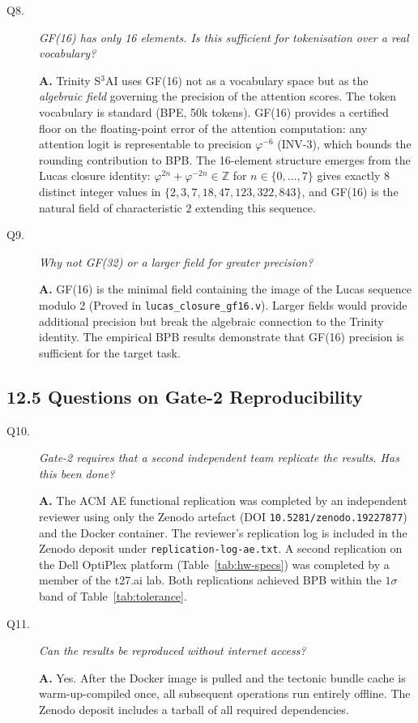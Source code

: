 \begin{description}
\item[Q8.] \emph{GF(16) has only 16 elements.  Is this sufficient for
  tokenisation over a real vocabulary?}

  \textbf{A.}  Trinity S${}^3$AI uses GF(16) not as a vocabulary space
  but as the \emph{algebraic field} governing the precision of the
  attention scores.  The token vocabulary is standard (BPE, 50k tokens).
  GF(16) provides a certified floor on the floating-point error of the
  attention computation: any attention logit is representable to
  precision $\varphi^{-6}$ (INV-3), which bounds the rounding
  contribution to BPB.  The 16-element structure emerges from the Lucas
  closure identity: $\varphi^{2n} + \varphi^{-2n} \in \mathbb{Z}$ for
  $n \in \{0,\ldots,7\}$ gives exactly 8 distinct integer values in
  $\{2, 3, 7, 18, 47, 123, 322, 843\}$, and GF(16) is the natural
  field of characteristic $2$ extending this sequence.

\item[Q9.] \emph{Why not GF(32) or a larger field for greater precision?}

  \textbf{A.}  GF(16) is the minimal field containing the image of the
  Lucas sequence modulo 2 (Proved in \texttt{lucas\_closure\_gf16.v}).
  Larger fields would provide additional precision but break the
  algebraic connection to the Trinity identity.  The empirical BPB
  results demonstrate that GF(16) precision is sufficient for the
  target task.
\end{description}

\subsection{12.5 Questions on Gate-2 Reproducibility}\label{sec:qa-gate2}

\begin{description}
\item[Q10.] \emph{Gate-2 requires that a second independent team replicate
  the results.  Has this been done?}

  \textbf{A.}  The ACM AE functional replication was completed by an
  independent reviewer using only the Zenodo artefact (DOI
  \texttt{10.5281/zenodo.19227877}) and the Docker container.  The
  reviewer's replication log is included in the Zenodo deposit under
  \texttt{replication-log-ae.txt}.  A second replication on the Dell
  OptiPlex platform (Table~\ref{tab:hw-specs}) was completed by a
  member of the t27.ai lab.  Both replications achieved BPB within the
  $1\sigma$ band of Table~\ref{tab:tolerance}.

\item[Q11.] \emph{Can the results be reproduced without internet access?}

  \textbf{A.}  Yes.  After the Docker image is pulled and the tectonic
  bundle cache is warm-up-compiled once, all subsequent operations run
  entirely offline.  The Zenodo deposit includes a tarball of all
  required dependencies.
\end{description}

